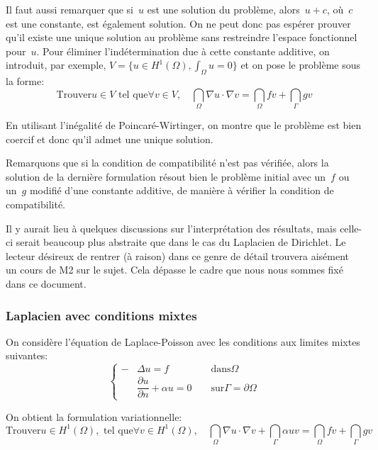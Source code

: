 \medskip
Il faut aussi remarquer que si~$u$ est une solution du problème, alors~$u+c$,
où~$c$ est une constante, est également solution.
On ne peut donc pas espérer prouver qu'il existe une unique solution
au problème sans restreindre l'espace fonctionnel pour~$u$.
Pour éliminer l'indétermination due à cette constante additive, on introduit, par exemple, $V = \{u\in H^1(\Omega), \int_\Omega u=0\}$
et on pose le problème sous la forme:
\begin{equation}
\text{Trouver}u\in V \text{ tel que}
\forall v\in V,\quad \dint_\Omega \nabla u\cdot\nabla v = \dint_\Omega fv + \dint_\Gamma gv
\end{equation}

En utilisant l'inégalité de Poincaré-Wirtinger, on montre que le problème est bien
coercif et donc qu'il admet une unique solution.

\medskip
Remarquons que si la condition de compatibilité n'est pas vérifiée,
alors la solution de la dernière formulation résout bien le problème initial avec
un~$f$ ou un~$g$ modifié d'une constante additive, de manière à vérifier
la condition de compatibilité.

\medskip
Il y aurait lieu à quelques discussions sur l'interprétation des résultats,
mais celle-ci serait beaucoup plus abstraite que dans le cas du Laplacien de Dirichlet.
Le lecteur désireux de rentrer (à raison) dans ce genre de détail trouvera
aisément un cours de M2 sur le sujet.
Cela dépasse le cadre que nous nous sommes fixé dans ce document.

\medskip
\subsubsection{Laplacien avec conditions mixtes}
On considère l'équation de Laplace-Poisson avec les conditions aux limites mixtes suivantes:
\begin{equation}\left\{\begin{aligned}
-&\Delta u=f &&\text{ dans} \Omega\\
&\dfrac{\partial u}{\partial n}+\alpha u=0 &&\text{ sur} \Gamma=\partial\Omega
\end{aligned}
\right.
\end{equation}

\medskip
On obtient la formulation variationnelle:
\begin{equation}
\text{Trouver}u\in H^1(\Omega), \text{ tel que}
\forall v\in H^1(\Omega),\quad \dint_\Omega \nabla u\cdot\nabla v +\dint_\Gamma \alpha u v = \dint_\Omega fv + \dint_\Gamma gv
\end{equation}

